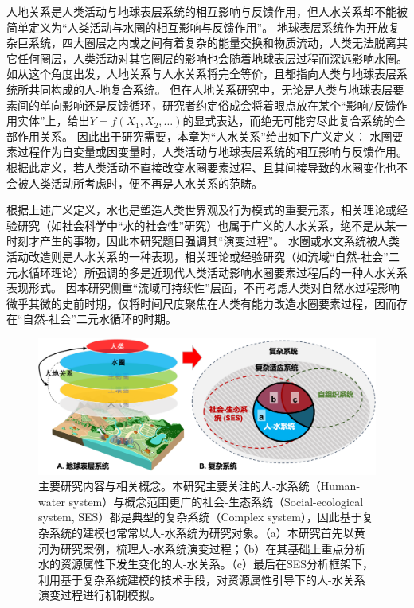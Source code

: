 人地关系是人类活动与地球表层系统的相互影响与反馈作用\cite{wu1991,li2016d}，但人水关系却不能被简单定义为“人类活动与水圈的相互影响与反馈作用”。
地球表层系统作为开放复杂巨系统，四大圈层之内或之间有着复杂的能量交换和物质流动，人类无法脱离其它任何圈层，人类活动对其它圈层的影响也会随着地球表层过程而深远影响水圈。
如从这个角度出发，人地关系与人水关系将完全等价，且都指向人类与地球表层系统所共同构成的人-地复合系统。
但在人地关系研究中，无论是人类与地球表层要素间的单向影响还是反馈循环，研究者约定俗成会将着眼点放在某个“影响/反馈作用实体”上，给出$Y = f(X_1, X_2, \dots)$的显式表达，而绝无可能穷尽此复合系统的全部作用关系。
因此出于研究需要，本章为“人水关系”给出如下广义定义：
水圈要素过程作为自变量或因变量时，人类活动与地球表层系统的相互影响与反馈作用。
根据此定义，若人类活动不直接改变水圈要素过程、且其间接导致的水圈变化也不会被人类活动所考虑时，便不再是人水关系的范畴。

根据上述广义定义，水也是塑造人类世界观及行为模式的重要元素，相关理论或经验研究（如社会科学中“水的社会性”研究）也属于广义的人水关系，绝不是从某一时刻才产生的事物，因此本研究题目强调其“演变过程”。
水圈或水文系统被人类活动改造则是人水关系的一种表现，相关理论或经验研究（如流域“自然-社会”二元水循环理论\cite{wang2006, wang2016}）所强调的多是近现代人类活动影响水圈要素过程后的一种人水关系表现形式。
因本研究侧重“流域可持续性”层面，不再考虑人类对自然水过程影响微乎其微的史前时期，仅将时间尺度聚焦在人类有能力改造水圈要素过程，因而存在“自然-社会”二元水循环的时期。

\begin{figure}[!htb]
    \includegraphics[width=\textwidth]{img/ch2/ch2_definitions.png}
    \caption[主要研究内容与相关概念]{主要研究内容与相关概念。本研究主要关注的人-水系统（Human-water system）与概念范围更广的社会-生态系统（Social-ecological system, SES）都是典型的复杂系统（Complex system），因此基于复杂系统的建模也常常以人-水系统为研究对象。（a）本研究首先以黄河为研究案例，梳理人-水系统演变过程；（b）在其基础上重点分析水的资源属性下发生变化的人-水关系。（c）最后在SES分析框架下，利用基于复杂系统建模的技术手段，对资源属性引导下的人-水关系演变过程进行机制模拟。}\label{ch2:fig:definitions}
\end{figure}

